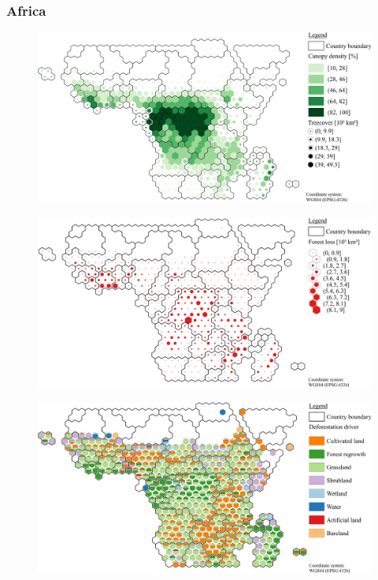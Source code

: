         \subsubsection{Africa}
	        \begin{figure}[ht]
		        \centering
		        \includegraphics[scale=1]{img/africa_treecover_frameless}
		        \caption[Ecosystem service values]{}
		        \label{fig:africacover}
	        \end{figure}
	        \begin{figure}[ht]
		        \centering
		        \includegraphics[scale=1]{img/africa_loss_frameless}
		        \caption[Ecosystem service values]{}
		        \label{fig:africaloss}
	        \end{figure}
	        \begin{figure}[ht]
		        \centering
		        \includegraphics[scale=1]{img/africa_driver_frameless}
		        \caption[Ecosystem service values]{}
		        \label{fig:africadriver}
	        \end{figure}

